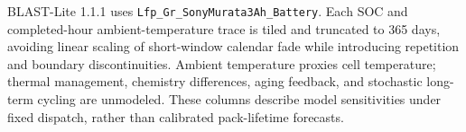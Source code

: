 BLAST-Lite 1.1.1 uses \texttt{Lfp\_Gr\_SonyMurata3Ah\_Battery}. Each SOC and completed-hour ambient-temperature trace is tiled and truncated to 365 days, avoiding linear scaling of short-window calendar fade while introducing repetition and boundary discontinuities. Ambient temperature proxies cell temperature; thermal management, chemistry differences, aging feedback, and stochastic long-term cycling are unmodeled. These columns describe model sensitivities under fixed dispatch, rather than calibrated pack-lifetime forecasts.

\begin{table}[htbp]
\centering\small

\caption{Mean across four 20-home window sensitivities (Beryl, derecho, August heat, and regular window w10). ET and rainflow columns are annualized capacity-loss percentages; BLAST repeats each trace to one year. Equal weighting across these windows is a reporting convention, not a representative annual climate mix. Mean SOC is a percentage. Lower predicted fade is preferable within a model; values across model classes are not interchangeable.}
\label{tab:aging}
\end{table}
\FloatBarrier
